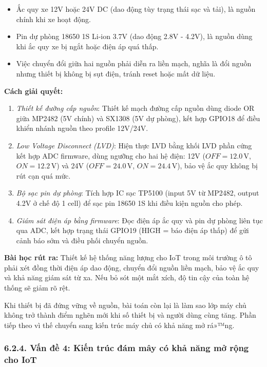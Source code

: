 \documentclass[a4paper]{extarticle}
\providecommand{\tightlist}{%
  \setlength{\itemsep}{0pt}\setlength{\parskip}{0pt}}
\begin{document}
\begin{itemize}
\tightlist
\item
  Ắc quy xe 12V hoặc 24V DC (dao động tùy trạng thái sạc và tải), là
  nguồn chính khi xe hoạt động.
\item
  Pin dự phòng 18650 1S Li-ion 3.7V (dao động 2.8V - 4.2V), là nguồn
  dùng khi ắc quy xe bị ngắt hoặc điện áp quá thấp.
\item
  Việc chuyển đổi giữa hai nguồn phải diễn ra liền mạch, nghĩa là đổi
  nguồn nhưng thiết bị không bị sụt điện, tránh reset hoặc mất dữ
  liệu.
\end{itemize}

\textbf{Cách giải quyết:}

\begin{enumerate}
\def\labelenumi{\arabic{enumi}.}
\tightlist
\item
  \emph{Thiết kế đường cấp nguồn}: Thiết kế mạch đường cấp nguồn dùng diode OR
  giữa MP2482 (5V chính) và SX1308 (5V dự phòng), kết hợp GPIO18 để điều
  khiển nhánh nguồn theo profile 12V/24V.
\item
  \emph{Low Voltage Disconnect (LVD)}: Hiện thực LVD bằng khối LVD phần
  cứng kết hợp ADC firmware, dùng ngưỡng cho hai hệ điện:
  12V (\(OFF = 12.0\,\mathrm{V}\), \(ON = 12.2\,\mathrm{V}\)) và
  24V (\(OFF = 24.0\,\mathrm{V}\), \(ON = 24.4\,\mathrm{V}\)),
  bảo vệ ắc quy không bị rút cạn
  quá mức.
\item
  \emph{Bộ sạc pin dự phòng}: Tích hợp IC sạc TP5100 (input 5V từ
  MP2482, output 4.2V ở chế độ 1 cell) để sạc pin 18650 1S khi điều kiện
  nguồn cho phép.
\item
  \emph{Giám sát điện áp bằng firmware}: Đọc điện áp ắc quy và pin dự
  phòng liên tục qua ADC, kết hợp trạng thái GPIO19 (HIGH = báo điện áp thấp)
  để gửi cảnh báo sớm và điều phối chuyển nguồn.
\end{enumerate}

\textbf{Bài học rút ra:} Thiết kế hệ thống năng lượng cho IoT trong môi
trường ô tô phải xét đồng thời điện áp dao động, chuyển đổi nguồn liền
mạch, bảo vệ ắc quy và khả năng giám sát từ xa. Nếu bỏ sót một mắt xích,
độ tin cậy của toàn hệ thống sẽ giảm rõ rệt.

Khi thiết bị đã đứng vững về nguồn, bài toán còn lại là làm sao lớp máy
chủ không trở thành điểm nghẽn mới khi số thiết bị và người dùng cùng
tăng. Phần tiếp theo vì thế chuyển sang kiến trúc máy chủ có khả năng mở
rá»™ng.

\subsubsection{6.2.4. Vấn đề 4: Kiến trúc đám mây có khả năng mở rộng
cho
IoT}\label{624-vux1ea5n-ux111ux1ec1-4-kiux1ebfn-truxfac-ux111uxe1m-muxe2y-cuxf3-khux1ea3-nux103ng-mux1edf-rux1ed9ng-cho-iot}
\end{document}
